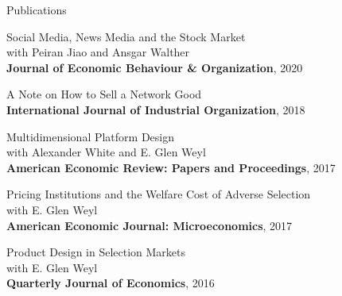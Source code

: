 \documentclass{resume}
\begin{document}
\begin{rSection}{Publications}
\begin{etaremune}
\item Social Media, News Media and the Stock Market\\ 
with Peiran Jiao and Ansgar Walther \\
\textbf{Journal of Economic Behaviour \& Organization}, 2020

\item A Note on How to Sell a Network Good \\
\textbf{International Journal of Industrial Organization}, 2018

\item Multidimensional Platform Design\\ 
with Alexander White and E. Glen Weyl \\
\textbf{American Economic Review: Papers and Proceedings}, 2017

\item Pricing Institutions and the Welfare Cost of Adverse Selection\\
 with E. Glen Weyl \\
\textbf{American Economic Journal: Microeconomics}, 2017

\item Product Design in Selection Markets\\
 with E. Glen Weyl \\ 
\textbf{Quarterly Journal of Economics}, 2016
	
\end{etaremune}






\end{rSection}
\end{document}
